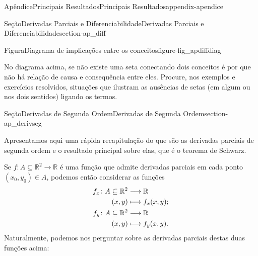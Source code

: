 \documentclass[oneside,10pt,]{book}
\numberwithin{equation}{section}
\newcommand{\R}{\mathbb R}
\begin{document}
\begin{appendixptx}{Apêndice}{Principais Resultados}{}{Principais Resultados}{}{}{appendix-apendice}
\begin{sectionptx}{Seção}{Derivadas Parciais e Diferenciabilidade}{}{Derivadas Parciais e Diferenciabilidade}{}{}{section-ap_diff}
\begin{figureptx}{Figura}{Diagrama de implicações entre os conceitos}{figure-fig_apdiffdiag}{}
\begin{image}{0.125}{0.75}{0.125}{}
%
\end{image}%
\tcblower
\end{figureptx}%
%
\par
No diagrama acima, se não existe uma seta conectando dois conceitos é por que não há relação de causa e consequência entre eles. Procure, nos exemplos e exercícios resolvidos, situações que ilustram as ausências de setas (em algum ou nos dois sentidos) ligando os termos.%
\end{sectionptx}
%
%
\typeout{************************************************}
\typeout{************************************************}
%
\begin{sectionptx}{Seção}{Derivadas de Segunda Ordem}{}{Derivadas de Segunda Ordem}{}{}{section-ap_derivseg}
\begin{introduction}{}%
Apresentamos aqui uma rápida recapitulação do que são as derivadas parciais de segunda ordem e o resultado principal sobre elas, que é o teorema de Schwarz.%
\par
Se \(f\colon A\subseteq\R^2\to\R\) é uma função que admite derivadas parciais em cada ponto \((x_0,y_0)\in A\), podemos então considerar as funções%
\begin{align*}
f_x\colon A\subseteq\R^2&\longrightarrow\R\\
\hfill (x,y)& \longmapsto f_x(x,y);\\
f_y\colon A\subseteq\R^2&\longrightarrow\R\\
(x,y)&\longmapsto f_y(x,y).
\end{align*}
Naturalmente, podemos nos perguntar sobre as derivadas parciais destas duas funções acima:%
\end{introduction}%

\end{sectionptx}
\end{appendixptx}
\end{document}
